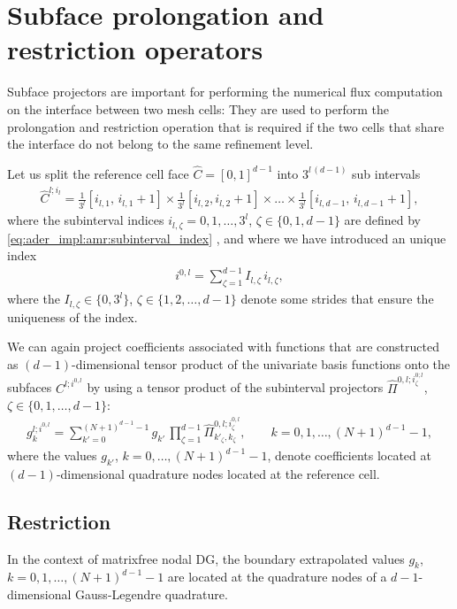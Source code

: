 \documentclass{scrreprt}
\theoremstyle{definition}
\theoremstyle{nonumberplain}
\begin{document}
\section{Subface prolongation and restriction operators}
\label{sec:amr:subface_operators}
Subface projectors are important for performing the numerical flux
computation
on the interface between two mesh cells:
They are used to perform the prolongation and restriction
operation that is required if the two cells that share
the interface do not belong to the same refinement level.

Let us split the reference cell face $\hat{C}=[0,1]^{d-1}$ into $3^{l\,(d-1)}$
sub intervals
\begin{align}
\hat{C}^{l;i_l} = \frac{1}{3^l}[i_{l,1},\,i_{l,1}+1] \times
\frac{1}{3^l}[i_{l,2},i_{l,2}+1] \times \ldots \times
\frac{1}{3^l}[i_{l,{d-1}},\,i_{l,{d-1}}+1],
\end{align}
where the subinterval indices $i_{l,\zeta}=0,1,\ldots,3^l$, $\zeta\in\{0,1,d-1\}$
are defined by \eqref{eq:ader_impl:amr:subinterval_index}
,
and where we have introduced an unique index
\begin{align}
\label{eq:ader_impl:amr:subface_index}
i^{0,l} = \sum_{\zeta=1}^{d-1} I_{l,\zeta}\,i_{l,\zeta},
\end{align}
where the $I_{l,\zeta}\in\{0,3^l\}$, $\zeta \in \{1,2,\ldots,d-1\}$ denote some
strides that ensure the uniqueness of the index.

We can again project coefficients associated with functions that
are constructed as $(d-1)$-dimensional tensor product
of the univariate basis functions onto the subfaces
$C^{l;i^{0,l}}$ by using a tensor product of the subinterval projectors
$\hat{\Pi}^{0,l;i^{0;l}_\zeta}$, $\zeta\in\{0,1,\ldots,d-1\}$:
\begin{align}
g^{l;i^{0,l}}_k = \sum_{k'=0}^{(N+1)^{d-1}-1} g_{k'}\,\prod_{\zeta=1}^{d-1}
\hat{\Pi}^{0,l;i^{0,l}_\zeta}_{k'_\zeta,k_\zeta},\qquad k = 0,1,\ldots,(N+1)^{d-1}-1,
\end{align}
where the values $g_{k'}$, $k=0,\ldots,(N+1)^{d-1}-1$, denote coefficients
located at $(d-1)$-dimensional quadrature nodes located at the reference cell. 

\subsection{Restriction}
In the context of matrixfree nodal DG, the boundary extrapolated
values $g_k$, $k=0,1,\ldots,(N+1)^{d-1}-1$ are located at the quadrature
nodes of a ${d-1}$-dimensional Gauss-Legendre quadrature.
\end{document}
